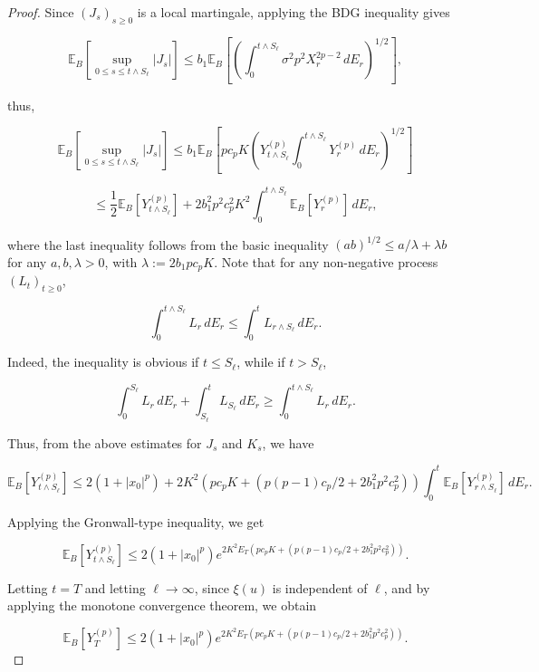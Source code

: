 \documentclass[10pt,reqno,final]{amsart}
\theoremstyle{plain}
\theoremstyle{definition}
\theoremstyle{remark}
\numberwithin{equation}{section}
\numberwithin{figure}{section}
\numberwithin{table}{section}
\begin{document}
\begin{proof}
	
	Since \( (J_s)_{s \geq 0} \) is a local martingale, applying the BDG inequality gives
	
	
	\[
	\mathbb{E}_B\left[\sup_{0 \leq s \leq t \wedge S_{\ell}} |J_s| \right] \leq b_1 \mathbb{E}_B \left[\left( \int_0^{t \wedge S_{\ell}} \sigma^2 p^2 X_r^{2p-2} \, dE_r \right)^{1/2}\right],
	\]
	
	
	thus,
	
	
	\[
	\mathbb{E}_B \left[\sup_{0 \leq s \leq t \wedge S_{\ell}} |J_s| \right] \leq b_1 \mathbb{E}_B \left[ p c_p K \left( Y_{t \wedge S_{\ell}}^{(p)} \int_0^{t \wedge S_{\ell}} Y_r^{(p)} \, dE_r \right)^{1/2} \right]
	\]
	
	
	
	
	\[
	\leq \frac{1}{2} \mathbb{E}_B \left[Y_{t \wedge S_{\ell}}^{(p)}\right] + 2b_1^2 p^2 c_p^2 K^2 \int_0^{t \wedge S_{\ell}} \mathbb{E}_B \left[Y_r^{(p)}\right] \, dE_r,
	\]
	
	
	where the last inequality follows from the basic inequality \( (ab)^{1/2} \leq a/\lambda + \lambda b \) for any \( a, b, \lambda > 0 \), with \( \lambda := 2b_1 p c_p K \).
	Note that for any non-negative process \( (L_t)_{t \geq 0} \),
	
	
	\[
	\int_0^{t \wedge S_{\ell}} L_r \, dE_r \leq \int_0^t L_{r \wedge S_{\ell}} \, dE_r.
	\]
	
	
	Indeed, the inequality is obvious if \( t \leq S_{\ell} \), while if \( t > S_{\ell} \),
	
	
	\[
	\int_0^{S_{\ell}} L_r \, dE_r + \int_{S_{\ell}}^t L_{S_{\ell}} \, dE_r \geq \int_0^{t \wedge S_{\ell}} L_r \, dE_r.
	\]
	
	
	Thus, from the above estimates for \( J_s \) and \( K_s \), we have
	
	
	\[
	\mathbb{E}_B[Y_{t \wedge S_{\ell}}^{(p)}] \leq 2(1 + |x_0|^p) + 2K^2\left(p c_p K + \left(p(p-1) c_p / 2 + 2b_1^2 p^2 c_p^2\right) \right) \int_0^t \mathbb{E}_B[Y_{r \wedge S_{\ell}}^{(p)}] \, dE_r.
	\]
	
	
	Applying the Gronwall-type inequality, we get
	
	
	\[
	\mathbb{E}_B[Y_{t \wedge S_{\ell}}^{(p)}] \leq 2(1 + |x_0|^p) e^{2K^2E_T \left(p c_p K + \left(p(p-1) c_p / 2 + 2b_1^2 p^2 c_p^2\right) \right) }.
	\]
	
	
	Letting \( t = T \) and letting \( \ell \to \infty \), since \( \xi(u) \) is independent of \( \ell \), and by applying the monotone convergence theorem, we obtain
	
	\begin{equation}\label{boundY}
		\mathbb{E}_B[Y_T^{(p)}] \leq 2(1 + |x_0|^p) e^{2K^2E_T \left(p c_p K + \left(p(p-1) c_p / 2 + 2b_1^2 p^2 c_p^2\right) \right)}.
	\end{equation}
\end{proof}
\end{document}

